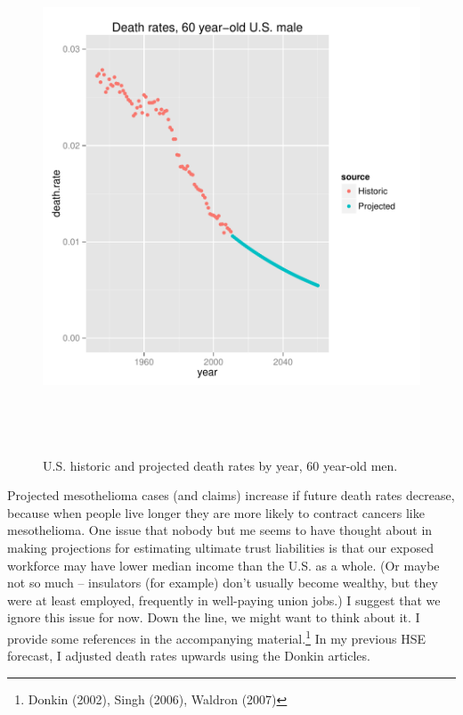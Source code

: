\documentclass{article}\usepackage{graphicx, color}
\newenvironment{knitrout}{}{} %
\begin{document}
\begin{figure}[ht]
\vspace{.3in}
\centering
\begin{knitrout}
\color{fgcolor}
\includegraphics[width=6in,height=6in]{figure/Chunk-us-demographic-example} 

\end{knitrout}

\caption{ U.S. historic and projected death rates by year, 60 year-old men.}
\vspace{.3in}
\end{figure}

Projected mesothelioma cases (and claims) increase if future death rates decrease, because when people live longer they are more likely to contract cancers like mesothelioma.  One issue that nobody but me seems to have thought about in making projections for estimating ultimate trust liabilities is that our exposed workforce may have lower median income than the U.S. as a whole.  (Or maybe not so much -- insulators (for example) don't usually become wealthy, but they were at least employed, frequently in well-paying union jobs.)  I suggest that we ignore this issue for now.  Down the line, we might want to think about it.  I provide some references in the accompanying material.\footnote{ Donkin (2002), Singh (2006), Waldron (2007)} In my previous HSE forecast, I adjusted death rates upwards using the Donkin articles.
\end{document}
